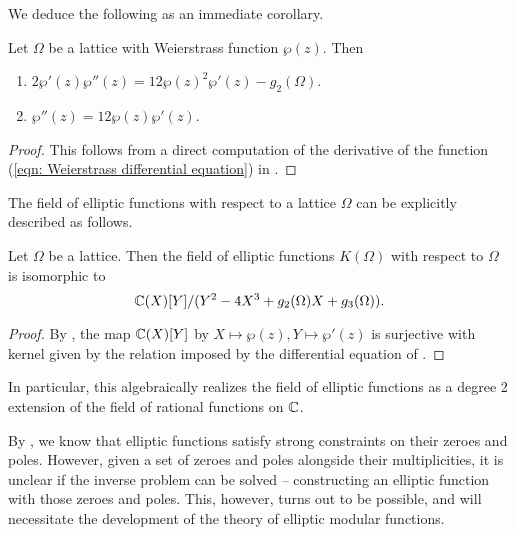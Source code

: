 We deduce the following as an immediate corollary. 
\begin{corollary}
    Let $\Omega$ be a lattice with Weierstrass function $\wp(z)$. Then 
    \begin{enumerate}[label=(\roman*)]
        \item $2\wp'(z)\wp''(z)=12\wp(z)^{2}\wp'(z)- g_{2}(\Omega)$. 
        \item $\wp''(z)=12\wp(z)\wp'(z)$. 
    \end{enumerate}
\end{corollary}
\begin{proof}
    This follows from a direct computation of the derivative of the function (\ref{eqn: Weierstrass differential equation}) in .
\end{proof}
The field of elliptic functions with respect to a lattice $\Omega$ can be explicitly described as follows. 
\begin{theorem}\label{thm: description of field of elliptic functions}
    Let $\Omega$ be a lattice. Then the field of elliptic functions $K(\Omega)$ with respect to $\Omega$ is isomorphic to 
    $$\mathbb{C}(X)[Y]/(Y^{2}-4X^{3}+g_{2}(\Omega)X+g_{3}(\Omega)).$$
\end{theorem}
\begin{proof}
    By , the map $\mathbb{C}(X)[Y]$ by $X\mapsto\wp(z), Y\mapsto\wp'(z)$ is surjective with kernel given by the relation imposed by the differential equation of . 
\end{proof}
In particular, this algebraically realizes the field of elliptic functions as a degree 2 extension of the field of rational functions on $\mathbb{C}$. 

By , we know that elliptic functions satisfy strong constraints on their zeroes and poles. However, given a set of zeroes and poles alongside their multiplicities, it is unclear if the inverse problem can be solved -- constructing an elliptic function with those zeroes and poles. This, however, turns out to be possible, and will necessitate the development of the theory of elliptic modular functions. 

